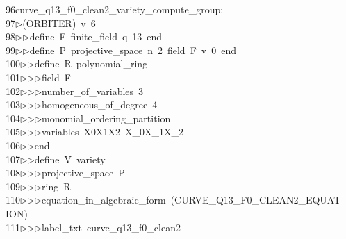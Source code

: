 \begin{tabbing}
96\>curve\_q13\_f0\_clean2\_variety\_compute\_group:\\[0pt]
97\>$\triangleright$\>(ORBITER)\ v\ 6\ \\[0pt]
98\>$\triangleright$\>$\triangleright$\>define\ F\ finite\_field\ q\ 13\ end\ \\[0pt]
99\>$\triangleright$\>$\triangleright$\>define\ P\ projective\_space\ n\ 2\ field\ F\ v\ 0\ end\ \\[0pt]
100\>$\triangleright$\>$\triangleright$\>define\ R\ polynomial\_ring\ \\[0pt]
101\>$\triangleright$\>$\triangleright$\>$\triangleright$\>field\ F\ \\[0pt]
102\>$\triangleright$\>$\triangleright$\>$\triangleright$\>number\_of\_variables\ 3\ \\[0pt]
103\>$\triangleright$\>$\triangleright$\>$\triangleright$\>homogeneous\_of\_degree\ 4\ \\[0pt]
104\>$\triangleright$\>$\triangleright$\>$\triangleright$\>monomial\_ordering\_partition\ \\[0pt]
105\>$\triangleright$\>$\triangleright$\>$\triangleright$\>variables\ X0X1X2\ X\_0X\_1X\_2\ \\[0pt]
106\>$\triangleright$\>$\triangleright$\>end\ \\[0pt]
107\>$\triangleright$\>$\triangleright$\>define\ V\ variety\ \\[0pt]
108\>$\triangleright$\>$\triangleright$\>$\triangleright$\>projective\_space\ P\ \\[0pt]
109\>$\triangleright$\>$\triangleright$\>$\triangleright$\>ring\ R\ \\[0pt]
110\>$\triangleright$\>$\triangleright$\>$\triangleright$\>equation\_in\_algebraic\_form\ (CURVE\_Q13\_F0\_CLEAN2\_EQUAT\\[0pt]
\>ION)\ \\[0pt]
111\>$\triangleright$\>$\triangleright$\>$\triangleright$\>label\_txt\ curve\_q13\_f0\_clean2\ \\[0pt]

\end{tabbing}
